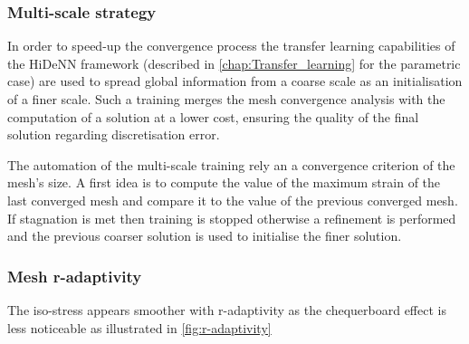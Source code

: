 \subsubsection{Multi-scale strategy}

In order to speed-up the convergence process the transfer learning capabilities of the HiDeNN framework (described in \cref{chap:Transfer_learning} for the parametric case) are used to spread global information from a coarse scale as an initialisation of a finer scale. Such a training merges the mesh convergence analysis with the computation of a solution at a lower cost, ensuring the quality of the final solution regarding discretisation error. 


The automation of the multi-scale training rely an a convergence criterion of the mesh's size. A first idea is to compute the value of the maximum strain of the last converged mesh and compare it to the value of the previous converged mesh. If stagnation is met then training is stopped otherwise a refinement is performed and the previous coarser solution is used to initialise the finer solution.


\subsubsection{Mesh r-adaptivity}


The iso-stress appears smoother with r-adaptivity as the chequerboard effect is less noticeable as illustrated in \cref{fig:r-adaptivity}

